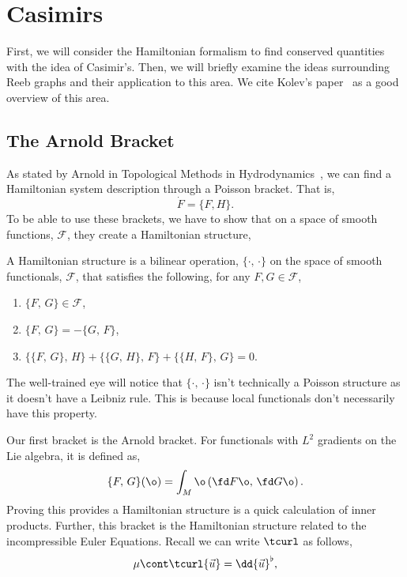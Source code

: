 
\section{Casimirs}
First, we will consider the Hamiltonian formalism to find conserved quantities with the idea of Casimir's. Then, we will briefly examine the ideas surrounding Reeb graphs and their application to this area. We cite Kolev's paper~\cite{Kolev_2007} as a good overview of this area.

\subsection{The Arnold Bracket}
As stated by Arnold in Topological Methods in Hydrodynamics~\cite{tmih}, we can find a Hamiltonian system description through a Poisson bracket. That is,
$$ \dot F = \{F, H\}. $$
\noindent
To be able to use these brackets, we have to show that on a space of smooth functions, $\mathcal{F}$, they create a Hamiltonian structure,
\begin{ndefi}
  A Hamiltonian structure is a bilinear operation, $\{\cdot,\,\cdot\}$ on the space of smooth functionals, $\mathcal{F}$, that satisfies the following, for any $F,G \in \mathcal{F}$,
  \begin{enumerate}
    \item $\{F,\, G\} \in \mathcal{F}$,
    \item $\{F,\, G\} = -\{G,\, F\}$,
    \item $\{\{F,\, G\},\, H\} + \{\{G ,\, H\},\, F\} + \{\{H,\, F\},\, G\} = 0$.
  \end{enumerate}
\end{ndefi}
\begin{remark}
   The well-trained eye will notice that $\{\cdot,\,\cdot\}$ isn't technically a Poisson structure as it doesn't have a Leibniz rule. This is because local functionals don't necessarily have this property.
\end{remark}
\noindent
Our first bracket is the Arnold bracket. For functionals with $L^2$ gradients on the Lie algebra, it is defined as,
$$ \{F,\, G\}(\o) = \int_M \o\left( \fd F \o,\, \fd G \o \right). $$
\noindent
Proving this provides a Hamiltonian structure is a quick calculation of inner products. Further, this bracket is the Hamiltonian structure related to the incompressible Euler Equations. Recall we can write $\tcurl$ as follows,
$$ \mu \cont \tcurl {\vec u} = \dd {\vec u}^\flat, $$
